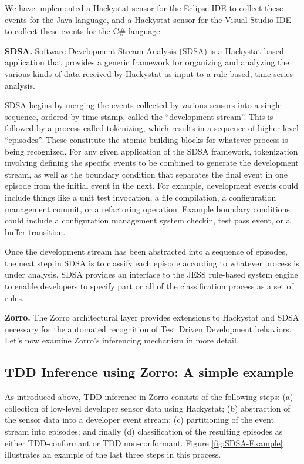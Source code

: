 \documentclass[smallextended]{svjour3}     %
\begin{document}
We have implemented a Hackystat sensor for the Eclipse IDE to collect these
events for the Java language, and a Hackystat sensor for the Visual Studio
IDE to collect these events for the C\# language.


{\bf SDSA.} Software Development Stream Analysis (SDSA) is a Hackystat-based application that
provides a generic framework for organizing and analyzing the various kinds
of data received by Hackystat as input to a rule-based, time-series
analysis.

SDSA begins by merging the events collected by various sensors into a
single sequence, ordered by time-stamp, called the ``development stream''.
This is followed by a process called tokenizing, which results in a
sequence of higher-level ``episodes''.  These constitute the atomic
building blocks for whatever process is being recognized.  For any given
application of the SDSA framework, tokenization involving defining the
specific events to be combined to generate the development stream, as well
as the boundary condition that separates the final event in one episode
from the initial event in the next. For example, development events could
include things like a unit test invocation, a file compilation, a
configuration management commit, or a refactoring operation.  Example
boundary conditions could include a configuration management system
checkin, test pass event, or a buffer transition.

Once the development stream has been abstracted into a sequence of
episodes, the next step in SDSA is to classify each episode according to
whatever process is under analysis.  SDSA provides an interface to the JESS
rule-based system engine to enable developers to specify part or all of the
classification process as a set of rules.


{\bf Zorro.} The Zorro architectural layer provides extensions to Hackystat and SDSA
necessary for the automated recognition of Test Driven Development
behaviors.  Let's now examine Zorro's inferencing mechanism in more detail. 

\subsection{TDD Inference using Zorro: A simple example}

As introduced above, TDD inference in Zorro consists of the following
steps: (a) collection of low-level developer sensor data using Hackystat;
(b) abstraction of the sensor data into a developer event stream; (c)
partitioning of the event stream into episodes; and finally
(d) classification of the resulting episodes as either TDD-conformant or TDD
non-conformant.  Figure \ref{fig:SDSA-Example} illustrates an example of
the last three steps in this process.
\end{document}
